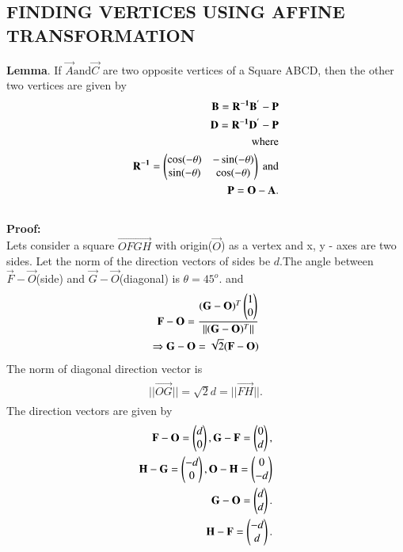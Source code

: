 \documentclass[journal,12pt,twocolumn]{IEEEtran}
\begin{document}
\subsection{FINDING VERTICES USING AFFINE TRANSFORMATION}
\textbf{Lemma}.
If $\vec{A} \text{and} \vec{C}$ are two opposite vertices of a Square ABCD, then the other two vertices are given by
\begin{align}
\begin{split}
\mathbf{B} = \mathbf{R^{-1}B^{'}}-\mathbf{P}\\
\mathbf{D} = \mathbf{R^{-1}D^{'}}-\mathbf{P}\\
\text{where}\\
\mathbf{R^{-1}} = \begin{pmatrix}\cos (-\theta) & -\sin (-\theta) \\ \sin (-\theta) & \cos (-\theta)\end{pmatrix} \ \text{and}\\
\mathbf{P} = \mathbf{O} - \mathbf{A}.\\
\end{split}
\end{align}
\\
\textbf{Proof:}
\\
Lets consider a square $\vec{OFGH}$ with origin($\vec{O}$) as a vertex and x, y - axes are two sides.  Let the norm of the direction vectors of sides be $d$.The angle between $\vec{F}-\vec{O}$(side) and $\vec{G}-\vec{O}$(diagonal) is  $\theta = 45^{o}$. and
\begin{align}
\begin{split}
\mathbf{F}-\mathbf{O} = \frac{(\mathbf{G}-\mathbf{O})^T\begin{pmatrix}1\\0\end{pmatrix}}{\Vert(\mathbf{G}-\mathbf{O})^T\Vert}\\
\Rightarrow \mathbf{G}-\mathbf{O} = \sqrt{2}(\mathbf{F}-\mathbf{O})\\
\end{split}
\end{align}
The norm of diagonal direction vector is
\begin{align}
\begin{split}
||\vec{OG}||=\sqrt{2}d=||\vec{FH}||.
\end{split}
\end{align}
The direction vectors are given by
\begin{align}
\begin{split}
\mathbf{F}-\mathbf{O}=\begin{pmatrix}d\\0\end{pmatrix},\mathbf{G}-\mathbf{F}=\begin{pmatrix}0\\d\end{pmatrix},\\ \mathbf{H}-\mathbf{G}=\begin{pmatrix}-d\\0\end{pmatrix},\mathbf{O}-\mathbf{H}=\begin{pmatrix}0\\-d\end{pmatrix}\\
\mathbf{G}-\mathbf{O}=\begin{pmatrix}d\\d\end{pmatrix}.\\
\mathbf{H}-\mathbf{F}=\begin{pmatrix}-d\\d\end{pmatrix}.\\
\end{split}
\end{align}
\end{document}
